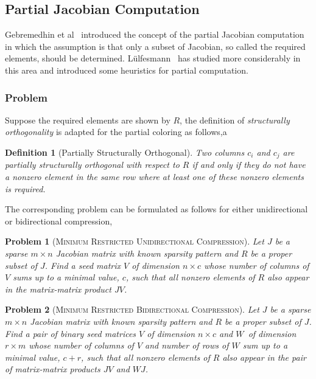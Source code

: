 \documentclass[11pt, twoside,a4paper]{book}
\newtheorem{problem}{Problem}
\newtheorem{definition}{Definition}
\newcommand{\col}{\ensuremath{c}}
\newcommand{\row}{\ensuremath{r}}
\newcommand{\MinStaBic}{\textsc{Minimum Star Bicoloring}}
\newcommand{\MinBidCom}{\textsc{Minimum Bidirectional Compression}}
\newcommand{\MinRUniCom}{\textsc{Minimum Restricted Unidirectional Compression}}
\newcommand{\MinRBidCom}{\textsc{Minimum Restricted Bidirectional Compression}}
\begin{document}
\subsection{Partial Jacobian Computation}
\label{s.part.jac}
Gebremedhin et al~\cite{Gebremedhin05whatcolor} introduced the concept of the partial Jacobian computation
in which the assumption is that only a subset of Jacobian, so called the required elements,
should be determined.
L{\"u}lfesmann~\cite{Lulfesmann2012Fap} has studied more considerably in this area and
introduced some heuristics for partial computation.
\subsubsection{Problem}
\label{ss.problem.part}
Suppose the required elements are shown by $R$, the definition of
\emph{structurally orthogonality} is adapted for the partial coloring as follows,a
\begin{definition}[Partially Structurally Orthogonal]\label{d.part.str.orth}
Two columns $c_i$ and $c_j$ are partially structurally orthogonal with respect to $R$
if and only if they do not have a nonzero element in the same row where at least
one of these nonzero elements is required.
\end{definition}

The corresponding problem can be formulated as follows for either unidirectional
or bidirectional compression,
\begin{problem}[\MinRUniCom]
\label{p.seed.runi} Let $J$ be a sparse ${m\times n}$ Jacobian matrix with known sparsity
pattern and $R$ be a proper subset of $J$. Find a seed matrix $V$ of dimension $n\times \col$
whose number of columns of $V$ sums up
to a minimal value, $\col$, such that all nonzero elements of $R$ also appear in
the matrix-matrix product $JV$.
\end{problem}

\begin{problem}[\MinRBidCom]
\label{p.seed.rbid} Let $J$ be a sparse ${m\times n}$ Jacobian matrix with known sparsity
pattern and $R$ be a proper subset of $J$.
Find a pair of binary seed matrices $V$ of dimension $n\times \col$ and $W$~of
dimension $\row \times m$ whose number of columns of $V$ and number of rows of $W$ sum up
to a minimal value, $\col + \row$, such that all nonzero elements of $R$ also appear in
the pair of matrix-matrix products $JV$ and $WJ$.
\end{problem}
\end{document}
